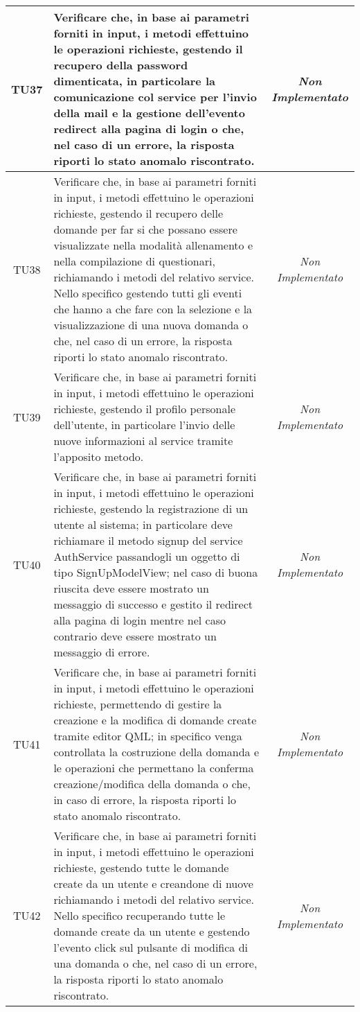 \begin{longtable}{|c|>{}m{10cm}|c|}
\hypertarget{TU37}{TU37} & Verificare che, in base ai parametri forniti in input, i metodi effettuino le operazioni richieste, gestendo il recupero della password dimenticata, in particolare la comunicazione col service per l'invio della mail e la gestione dell'evento redirect alla pagina di login o che, nel caso di un errore, la risposta riporti lo stato anomalo riscontrato. & \textit{Non Implementato}\\ \hline
\hypertarget{TU38}{TU38} & Verificare che, in base ai parametri forniti in input, i metodi effettuino le operazioni richieste, gestendo il recupero delle domande per far si che possano essere visualizzate nella modalità allenamento e nella compilazione di questionari, richiamando i metodi del relativo service. Nello specifico gestendo tutti gli eventi che hanno a che fare con la selezione e la visualizzazione di una nuova domanda o che, nel caso di un errore, la risposta riporti lo stato anomalo riscontrato. & \textit{Non Implementato}\\ \hline
\hypertarget{TU39}{TU39} & Verificare che, in base ai parametri forniti in input, i metodi effettuino le operazioni richieste, gestendo il profilo personale dell'utente, in particolare l'invio delle nuove informazioni al service tramite l'apposito metodo. & \textit{Non Implementato}\\ \hline
\hypertarget{TU40}{TU40} & Verificare che, in base ai parametri forniti in input, i metodi effettuino le operazioni richieste, gestendo la registrazione di un utente al sistema; in particolare deve richiamare il metodo signup del service AuthService passandogli un oggetto
di tipo SignUpModelView; nel caso di buona riuscita deve essere mostrato un messaggio di successo e gestito il redirect alla pagina di login mentre nel caso contrario deve essere mostrato un messaggio di errore. & \textit{Non Implementato}\\ \hline
\hypertarget{TU41}{TU41} & Verificare che, in base ai parametri forniti in input, i metodi effettuino le operazioni richieste, permettendo di gestire la creazione e la modifica di domande create tramite editor QML; in specifico venga controllata la costruzione della domanda e le operazioni che permettano la conferma creazione/modifica della domanda o che, in caso di errore, la risposta riporti lo stato anomalo riscontrato. & \textit{Non Implementato}\\ \hline
\hypertarget{TU42}{TU42} & Verificare che, in base ai parametri forniti in input, i metodi effettuino le operazioni richieste, gestendo tutte le domande create da un utente e creandone di nuove richiamando i metodi del relativo service. Nello specifico recuperando tutte le domande create da un utente e gestendo l'evento click sul pulsante di modifica di una domanda o che, nel caso di un errore, la risposta riporti lo stato anomalo riscontrato. & \textit{Non Implementato}\\ \hline

\end{longtable}
